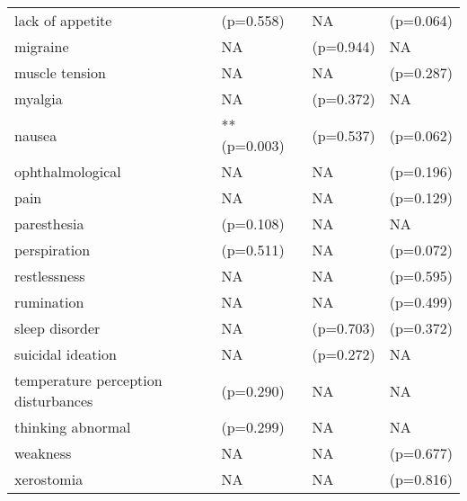 \begin{table}[!h]
\begin{tabular}[t]{llll}
lack of appetite & (p=0.558) & NA & (p=0.064)\\
\addlinespace
migraine & NA & (p=0.944) & NA\\
muscle tension & NA & NA & (p=0.287)\\
myalgia & NA & (p=0.372) & NA\\
nausea & ** (p=0.003) & (p=0.537) & (p=0.062)\\
ophthalmological & NA & NA & (p=0.196)\\
\addlinespace
pain & NA & NA & (p=0.129)\\
paresthesia & (p=0.108) & NA & NA\\
perspiration & (p=0.511) & NA & (p=0.072)\\
restlessness & NA & NA & (p=0.595)\\
rumination & NA & NA & (p=0.499)\\
\addlinespace
sleep disorder & NA & (p=0.703) & (p=0.372)\\
suicidal ideation & NA & (p=0.272) & NA\\
temperature perception disturbances & (p=0.290) & NA & NA\\
thinking abnormal & (p=0.299) & NA & NA\\
weakness & NA & NA & (p=0.677)\\
\addlinespace
xerostomia & NA & NA & (p=0.816)\\
\bottomrule
\end{tabular}
\end{table}

